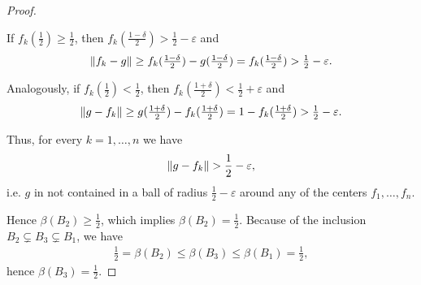 \begin{proof}
\begin{figure}[ht]
\begin{Center}
    \end{Center}
  \end{figure}

  If \( f_k(\tfrac 1 2) \geq \frac 1 2 \), then \( f_k(\tfrac {1 - \delta} 2) > \tfrac 1 2 - \varepsilon \) and
  \begin{align*}
    \left\Vert f_k - g \right\Vert \geq f_k(\tfrac {1 - \delta} 2) - g(\tfrac {1 - \delta} 2) = f_k(\tfrac {1 - \delta} 2) > \tfrac 1 2 - \varepsilon.
  \end{align*}

  Analogously, if \( f_k(\tfrac 1 2) < \frac 1 2 \), then \( f_k(\tfrac {1 + \delta} 2) < \tfrac 1 2 + \varepsilon \) and
  \begin{align*}
    \left\Vert g - f_k \right\Vert \geq g(\tfrac {1 + \delta} 2) - f_k(\tfrac {1 + \delta} 2) = 1 - f_k(\tfrac {1 + \delta} 2) > \tfrac 1 2 - \varepsilon.
  \end{align*}

  Thus, for every \( k = 1, \ldots, n \) we have
  \begin{align*}
    \left\Vert g - f_k \right\Vert > \frac 1 2 - \varepsilon,
  \end{align*}
  i.e. \( g \) in not contained in a ball of radius \( \frac 1 2 - \varepsilon \) around any of the centers \( f_1, \ldots, f_n \).

  Hence \( \beta(B_2) \geq \frac 1 2 \), which implies \( \beta(B_2) = \frac 1 2 \). Because of the inclusion \( B_2 \subsetneq B_3 \subsetneq B_1 \), we have
  \begin{align*}
    \frac 1 2 = \beta(B_2) \leq \beta(B_3) \leq \beta(B_1) = \frac 1 2,
  \end{align*}
  hence \( \beta(B_3) = \frac 1 2 \).
\end{proof}


